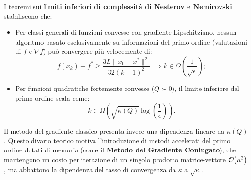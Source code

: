 I teoremi sui \textbf{limiti inferiori di complessit\`a di Nesterov e Nemirovski}~\cite{nesterov2004introductory} stabiliscono che:
\begin{itemize}
    \item Per classi generali di funzioni convesse con gradiente Lipschitziano, nessun algoritmo basato esclusivamente su informazioni del primo ordine (valutazioni di $f$ e $\nabla f$) pu\`o convergere pi\`u velocemente di:
    \begin{equation}
        f(x_k) - f^* \ge \frac{3 L \|x_0 - x^*\|^2}{32 (k + 1)^2} \implies k \in \Omega\left(\frac{1}{\sqrt{\epsilon}}\right);
    \end{equation}
    \item Per funzioni quadratiche fortemente convesse ($Q \succ 0$), il limite inferiore del primo ordine scala come:
    \begin{equation}
        k \in \Omega\left(\sqrt{\kappa(Q)} \log\left(\frac{1}{\epsilon}\right)\right).
    \end{equation}
\end{itemize}
Il metodo del gradiente classico presenta invece una dipendenza lineare da $\kappa(Q)$. Questo divario teorico motiva l'introduzione di metodi accelerati del primo ordine dotati di memoria (come il \textbf{Metodo del Gradiente Coniugato}), che mantengono un costo per iterazione di un singolo prodotto matrice-vettore $\mathcal{O}\!\left(n^2\right)$, ma abbattono la dipendenza del tasso di convergenza da $\kappa$ a $\sqrt{\kappa}$.

